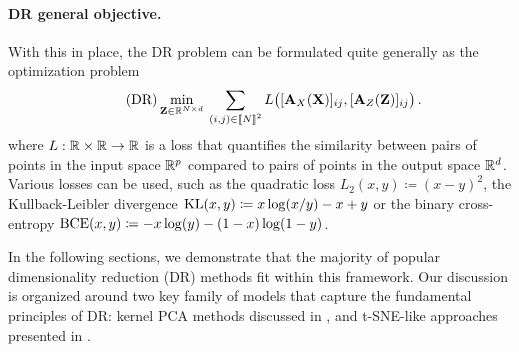\paragraph{DR general objective.} With this in place, the DR problem can be formulated quite generally as the optimization problem
\begin{equation}
\label{eq:DR_criterion}\tag{DR}
\min_{\mZ \in \R^{N \times d}} \: \sum_{(i,j) \in \integ{N}^2}  L\big([\simiX(\mX)]_{ij}, [\simi(\mZ)]_{ij}\big) \,. %
\end{equation}
where $L:\mathbb{R} \times \mathbb{R} \rightarrow \mathbb{R}$ is a loss that quantifies the similarity between pairs of points in the input space $\mathbb{R}^{p}$ compared to pairs of points in the output space $\mathbb{R}^{d}$. Various losses can be used, such as the quadratic loss $L_2(x,y) \coloneqq (x - y)^2$, the Kullback-Leibler divergence $\operatorname{KL}(x,y) \coloneqq x \log (x/y) - x +y$ or the binary cross-entropy $\operatorname{BCE}(x,y) \coloneqq -x \log(y) - (1-x) \log(1-y)$.

In the following sections, we demonstrate that the majority of popular dimensionality reduction (DR) methods fit within this framework. Our discussion is organized around two key family of models that capture the fundamental principles of DR: kernel PCA methods discussed in , and t-SNE-like approaches presented in .



